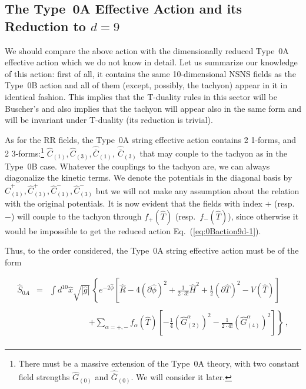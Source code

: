\documentclass[12pt,a4paper]{article}
\begin{document}

\subsection{The Type~0A Effective Action and its Reduction to $d=9$}

We should compare the above action with the dimensionally reduced
Type~0A effective action which we do not know in detail. Let us
summarize our knowledge of this action: first of all, it contains the
same 10-dimensional NSNS fields as the Type~0B action and all of them
(except, possibly, the tachyon) appear in it in identical fashion.
This implies that the T-duality rules in this sector will be Buscher's
and also implies that the tachyon will appear also in the same form
and will be invariant under T-duality (its reduction is trivial).

As for the RR fields, the Type~0A string effective action contains 2
1-forms, and 2 3-forms:\footnote{There must be a massive extension of
  the Type~0A theory, with two constant
  field strengths $\hat{G}_{(0)}$ and $\hat{\overline{G}}_{(0)}$. We will
  consider it later.}
$\hat{C}_{(1)},\hat{C}_{(3)},\hat{\overline{C}}_{(1)},
\ \hat{\overline{C}}_{(3)}$
that may couple to the tachyon as in the Type~0B case.  Whatever the
couplings to the tachyon are, we can always diagonalize the kinetic
terms. We denote the potentials in the diagonal basis by
$\hat{C}^{+}_{(1)},\hat{C}^{+}_{(3)},\hat{C}^{-}_{(1)},\hat{C}^{-}_{(3)}$
but we will not make any assumption about the relation with the
original potentials. It is now evident that the fields with index $+$
(resp.~$-$) will couple to the tachyon through $f_{+}(\hat{T})$
(resp.~$f_{-}(\hat{T})$), since otherwise it would be impossible to get the
reduced action Eq.~(\ref{eq:0Baction9d-1}).

Thus, to the order considered, the Type~0A string effective action
must be of the form

\begin{equation}
\label{eq:0Aaction-1}
\begin{array}{rcl}
\hat{S}_{0A} & = & {\displaystyle\int} d^{10}\hat{x}\sqrt{|\hat{g}|}\,
\left\{e^{-2\hat{\phi}} \left[ \hat{R} -4(\partial\hat{\phi})^{2}
+\frac{1}{2\cdot 3!}\hat{H}^{2}+\frac{1}{2}(\partial\hat{T})^{2}
-V(\hat{T})\right] \right.\\
& & \\
& & 
\hspace{2cm}
\left.
+\sum_{\alpha=+,-}f_{\alpha}(\hat{T})
\left[-\frac{1}{4}\left(\hat{G}_{(2)}^{\alpha}\right)^{2} 
-\frac{1}{2\cdot 4!}\left(\hat{G}_{(4)}^{\alpha}\right)^{2}
\right]
\right\}\, ,\\
\end{array}
\end{equation}
\end{document}
